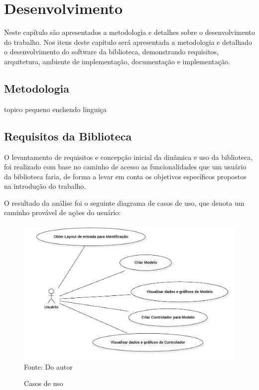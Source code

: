 \chapter{Desenvolvimento}
Neste capítulo são apresentados a metodologia e detalhes sobre o desenvolvimento do trabalho.
Nos itens deste capítulo será apresentada a metodologia e detalhado o desenvolvimento do software da biblioteca,
demonstrando requisitos, arquitetura, ambiente de implementação, documentação e implementação.


\section{Metodologia}
topico pequeno enchendo linguiça


\section{Requisitos da Biblioteca}

O levantamento de requisitos e concepção inicial da dinâmica e uso da biblioteca, foi realizado com base no caminho de
acesso as funcionalidades que um usuário da biblioteca faria, de forma a levar em conta os objetivos específicos
propostos na introdução do trabalho.

O resultado da análise foi o seguinte diagrama de casos de uso, que denota um caminho provável de ações do usuário:

\begin{figure}[H]
    \centering
    \caption{Casos de uso}
    \includegraphics[scale=0.5]{figuras/use_cases}
    \label{fig:use_cases}
    \\
    \vspace{0cm}\hspace{0cm}\small{Fonte: Do autor}
\end{figure}

